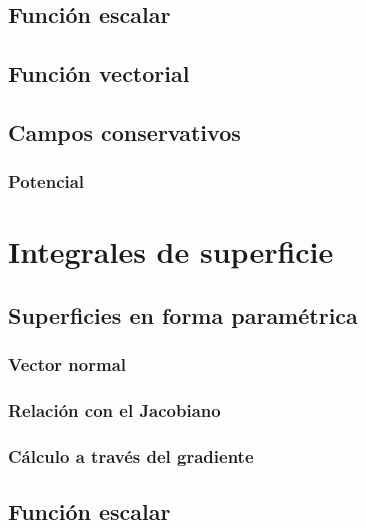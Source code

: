 \documentclass[12pt, fleqn]{report}                             %
\theoremstyle{break}                                            %
\begin{document}
            \subsection{Función escalar}
            
            \subsection{Función vectorial}
            
            \subsection{Campos conservativos}
            
                \subsubsection{Potencial}
        
        \section{Integrales de superficie}
        
            \subsection{Superficies en forma paramétrica}
            
                \subsubsection{Vector normal}
            
                \subsubsection{Relación con el Jacobiano}
                
                \subsubsection{Cálculo a través del gradiente}
            
            \subsection{Función escalar}
            
\end{document}
